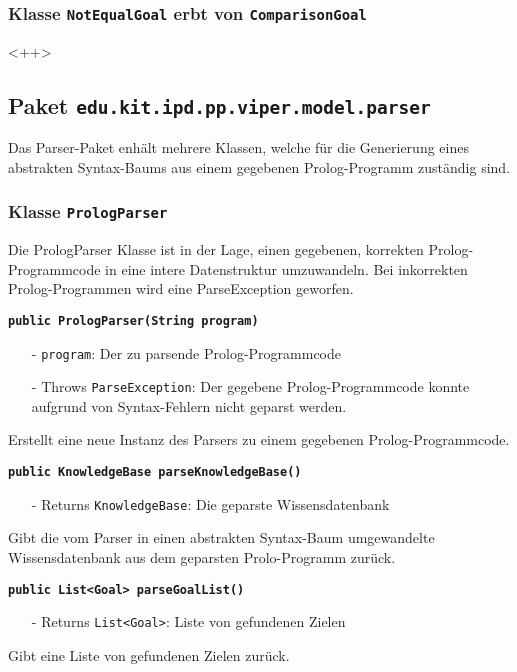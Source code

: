\documentclass[parskip=full,11pt,twoside]{scrartcl}
\begin{document}
\subsubsection{Klasse \texttt{NotEqualGoal} erbt von \texttt{ComparisonGoal}}
<++>

\newpage
\subsection{Paket \texttt{edu.kit.ipd.pp.viper.model.parser}}

Das Parser-Paket enhält mehrere Klassen, welche für die Generierung eines abstrakten Syntax-Baums aus einem gegebenen Prolog-Programm zuständig sind.

\subsubsection{Klasse \texttt{PrologParser}}

Die PrologParser Klasse ist in der Lage, einen gegebenen, korrekten Prolog-Programmcode in eine intere Datenstruktur umzuwandeln. Bei inkorrekten Prolog-Programmen wird eine ParseException geworfen.

\textbf{\texttt{public PrologParser(String program)}}
\begin{itemize}[noitemsep]
	\item[-] \texttt{program}: Der zu parsende Prolog-Programmcode
	\item[-] Throws \texttt{ParseException}: Der gegebene Prolog-Programmcode konnte aufgrund von Syntax-Fehlern nicht geparst werden.
\end{itemize}
Erstellt eine neue Instanz des Parsers zu einem gegebenen Prolog-Programmcode.

\textbf{\texttt{public KnowledgeBase parseKnowledgeBase()}}
\begin{itemize}[noitemsep]
	\item[-] Returns \texttt{KnowledgeBase}: Die geparste Wissensdatenbank
\end{itemize}
Gibt die vom Parser in einen abstrakten Syntax-Baum umgewandelte Wissensdatenbank aus dem geparsten Prolo-Programm zurück.

\textbf{\texttt{public List<Goal> parseGoalList()}}
\begin{itemize}[noitemsep]
	\item[-] Returns \texttt{List<Goal>}: Liste von gefundenen Zielen
\end{itemize}
Gibt eine Liste von gefundenen Zielen zurück.
\end{document}
